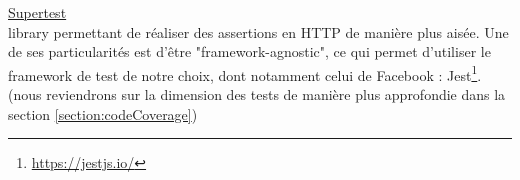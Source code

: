 \noindent\underline{\href{https://github.com/visionmedia/supertest}{Supertest}}\\

\Gls{library} permettant de réaliser des assertions en HTTP de manière plus aisée.
Une de ses particularités est d'être "framework-agnostic", ce qui permet d'utiliser le framework de test de notre choix, dont notamment celui de Facebook : Jest\footnote{
    \url{https://jestjs.io/}
}. (nous reviendrons sur la dimension des tests de manière plus approfondie dans la section \ref{section:codeCoverage})\\

\pagebreak